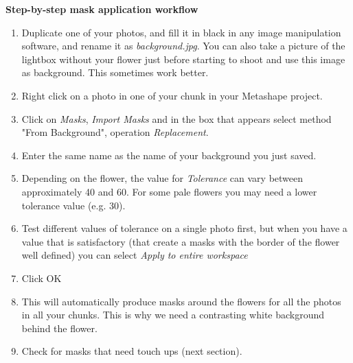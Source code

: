 \documentclass[10pt,letter,english]{article}
\begin{document}
\noindent \textbf{Step-by-step mask application workflow}

\begin{enumerate} 
    \item Duplicate one of your photos, and fill it in black in any image manipulation software, and rename it as \textit{background.jpg}. You can also take a picture of the lightbox without your flower just before starting to shoot and use this image as background. This sometimes work better.
    \item Right click on a photo in one of your chunk in your Metashape project.
    \item Click on \textit{Masks}, \textit{Import Masks} and in the box that appears select method "From Background", operation  \textit{Replacement}.
    \item Enter the same name as the name of your background you just saved.
    \item Depending on the flower, the value for \textit{Tolerance} can vary between approximately 40 and 60. For some pale flowers you may need a lower tolerance value (e.g. 30).
    \item Test different values of tolerance on a single photo first, but when you have a value that is satisfactory (that create a masks with the border of the flower well defined) you can select \textit{Apply to entire workspace}
    \item Click OK
    \item This will automatically produce masks around the flowers for all the photos in all your chunks. This is why we need a contrasting white background behind the flower.
    \item Check for masks that need touch ups (next section).
\end{enumerate}
\end{document}
